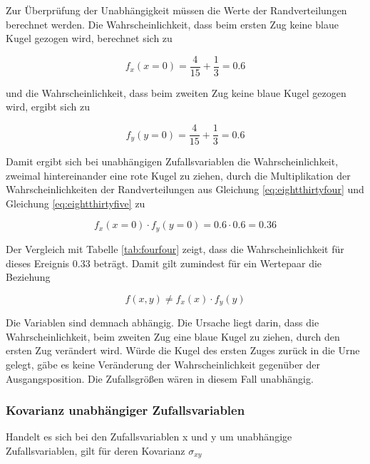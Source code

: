 \noindent Zur \"{U}berpr\"{u}fung der Unabh\"{a}ngigkeit m\"{u}ssen die Werte der Randverteilungen berechnet werden. Die Wahrscheinlichkeit, dass beim ersten Zug keine blaue Kugel gezogen wird, berechnet sich zu

\begin{equation}\label{eq:eightthirtyfour}
f_{x} (x=0)=\dfrac{4}{15} +\dfrac{1}{3} =0.6
\end{equation}


\noindent und die Wahrscheinlichkeit, dass beim zweiten Zug keine blaue Kugel gezogen wird, ergibt sich zu

\begin{equation}\label{eq:eightthirtyfive}
f_{y} (y=0)=\dfrac{4}{15} +\dfrac{1}{3} =0.6
\end{equation}

\noindent Damit ergibt sich bei unabh\"{a}ngigen Zufallsvariablen die Wahrscheinlichkeit, zweimal hintereinander eine rote Kugel zu ziehen, durch die Multiplikation der Wahrscheinlichkeiten der Randverteilungen aus Gleichung \eqref{eq:eightthirtyfour} und Gleichung \eqref{eq:eightthirtyfive} zu

\begin{equation}\label{eq:eightthirtysix}
f_{x} (x=0)\cdot f_{y} (y=0)=0.6\cdot 0.6=0.36
\end{equation}

\noindent Der Vergleich mit Tabelle \ref{tab:fourfour} zeigt, dass die Wahrscheinlichkeit f\"{u}r dieses Ereignis 0.33 betr\"{a}gt. Damit gilt zumindest f\"{u}r ein Wertepaar die Beziehung

\begin{equation}\label{eq:eightthirtyseven}
f(x,y)\ne f_{x} (x)\cdot f_{y} (y)
\end{equation}

\noindent Die Variablen sind demnach abh\"{a}ngig. Die Ursache liegt darin, dass die Wahrscheinlichkeit, beim zweiten Zug eine blaue Kugel zu ziehen, durch den ersten Zug ver\"{a}ndert wird. W\"{u}rde die Kugel des ersten Zuges zur\"{u}ck in die Urne gelegt, g\"{a}be es keine Ver\"{a}nderung der Wahrscheinlichkeit gegen\"{u}ber der Ausgangsposition. Die Zufallsgr\"{o}{\ss}en w\"{a}ren in diesem Fall unabh\"{a}ngig.

\subsubsection{Kovarianz unabh\"{a}ngiger Zufallsvariablen}

\noindent Handelt es sich bei den Zufallsvariablen x und y um unabh\"{a}ngige Zufallsvariablen, gilt f\"{u}r deren Kovarianz $\sigma_{xy}$

